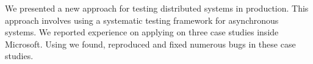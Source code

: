 We presented a new approach for testing distributed systems in production. This approach involves using \psharp a systematic testing framework for asynchronous systems. We reported experience on applying \psharp on three case studies inside Microsoft. Using \psharp we found, reproduced and fixed numerous bugs in these case studies.